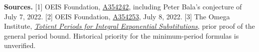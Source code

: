 \documentclass[11pt,letterpaper]{article}
\newcommand{\oeis}[1]{\href{https://oeis.org/#1}{#1}}
\begin{document}
{\small \textbf{Sources.} [1] OEIS Foundation, \oeis{A354242}, including Peter Bala's conjecture of July 7, 2022. [2] OEIS Foundation, \oeis{A354253}, July 8, 2022. [3] The Omega Institute, \href{https://the-omega-institute.github.io/trureturing-mdbook/Blueprint/D5/S1/Recurrence/Periodic/IntegralEgfTotientPeriod.html}{\emph{Totient Periods for Integral Exponential Substitutions}}, prior proof of the general period bound. Historical priority for the minimum-period formulas is unverified.}
\end{document}
